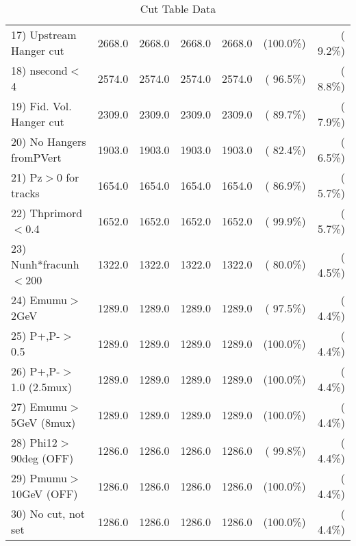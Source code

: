 \begin{table}[h!]
\begin{tabular}{||l||r|r|r|r|r|r||}
 17) Upstream Hanger cut  &       2668.0 &       2668.0 &       2668.0 &       2668.0 & (100.0\%) & (  9.2\%) \\
 18) nsecond$<$4          &       2574.0 &       2574.0 &       2574.0 &       2574.0 & ( 96.5\%) & (  8.8\%) \\
 19) Fid. Vol. Hanger cut &       2309.0 &       2309.0 &       2309.0 &       2309.0 & ( 89.7\%) & (  7.9\%) \\
 20) No Hangers fromPVert &       1903.0 &       1903.0 &       1903.0 &       1903.0 & ( 82.4\%) & (  6.5\%) \\
 21) Pz$>$0 for tracks    &       1654.0 &       1654.0 &       1654.0 &       1654.0 & ( 86.9\%) & (  5.7\%) \\
 22) Thprimord$<$0.4      &       1652.0 &       1652.0 &       1652.0 &       1652.0 & ( 99.9\%) & (  5.7\%) \\
 23) Nunh*fracunh$<$200   &       1322.0 &       1322.0 &       1322.0 &       1322.0 & ( 80.0\%) & (  4.5\%) \\
 24) Emumu$>$2GeV         &       1289.0 &       1289.0 &       1289.0 &       1289.0 & ( 97.5\%) & (  4.4\%) \\
 25) P+,P-$>$0.5          &       1289.0 &       1289.0 &       1289.0 &       1289.0 & (100.0\%) & (  4.4\%) \\
 26) P+,P-$>$1.0 (2.5mux) &       1289.0 &       1289.0 &       1289.0 &       1289.0 & (100.0\%) & (  4.4\%) \\
 27) Emumu$>$5GeV  (8mux) &       1289.0 &       1289.0 &       1289.0 &       1289.0 & (100.0\%) & (  4.4\%) \\
 28) Phi12$>$90deg  (OFF) &       1286.0 &       1286.0 &       1286.0 &       1286.0 & ( 99.8\%) & (  4.4\%) \\
 29) Pmumu$>$10GeV  (OFF) &       1286.0 &       1286.0 &       1286.0 &       1286.0 & (100.0\%) & (  4.4\%) \\
 30) No cut, not set      &       1286.0 &       1286.0 &       1286.0 &       1286.0 & (100.0\%) & (  4.4\%) \\
 \hline
 \hline
 \end{tabular}
 \caption{Cut Table  Data     }
 \label{tab-cutcohjpsi-mumu_data}
 \end{table}

